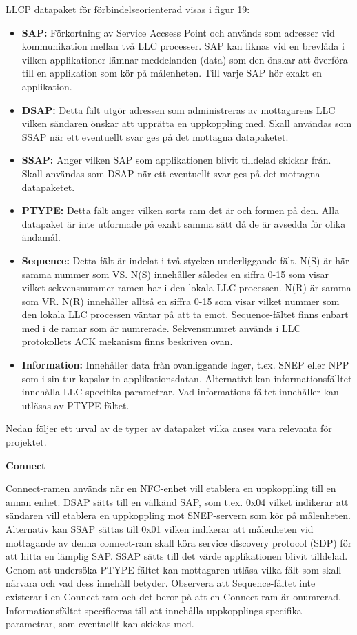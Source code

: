 \documentclass[11pt]{article}
\begin{document}
LLCP datapaket för förbindelseorienterad visas i figur 19: 


\begin{itemize}
\item \textbf{SAP:} Förkortning av Service Accsess Point och används som adresser vid kommunikation mellan två LLC processer. SAP kan liknas vid en brevlåda i vilken applikationer lämnar meddelanden (data) som den önskar att överföra till en applikation som kör på målenheten. Till varje SAP hör exakt en applikation. 
\item \textbf{DSAP:} Detta fält utgör adressen som administreras av mottagarens LLC vilken sändaren önskar att upprätta en uppkoppling med. Skall användas som SSAP när ett eventuellt svar ges på det mottagna datapaketet.
\item \textbf{SSAP:} Anger vilken SAP som applikationen blivit tilldelad skickar från. Skall användas som DSAP när ett eventuellt svar ges på det mottagna datapaketet.
\item \textbf{PTYPE:} Detta fält anger vilken sorts ram det är och formen på den. Alla datapaket är inte utformade på exakt samma sätt då de är avsedda för olika ändamål.
\item \textbf{Sequence:} Detta fält är indelat i två stycken underliggande fält. N(S) är här samma nummer som VS. N(S) innehåller således en siffra 0-15 som visar vilket sekvensnummer ramen har i den lokala LLC processen. N(R) är samma som VR. N(R) innehåller alltså en siffra 0-15 som visar vilket nummer som den lokala LLC processen väntar på att ta emot. Sequence-fältet finns enbart med i de ramar som är numrerade. Sekvensnumret används i LLC protokollets ACK mekanism finns beskriven ovan.
\item \textbf{Information:} Innehåller data från ovanliggande lager, t.ex. SNEP eller NPP som i sin tur kapslar in applikationsdatan. Alternativt kan informationsfälltet innehålla LLC specifika parametrar. Vad informations-fältet innehåller kan utläsas av PTYPE-fältet.
\end{itemize}

Nedan följer ett urval av de typer av datapaket vilka anses vara relevanta för projektet.

\textbf{Connect}


Connect-ramen används när en NFC-enhet vill etablera en uppkoppling till en annan enhet. DSAP sätts till en välkänd SAP, som t.ex. 0x04 vilket indikerar att sändaren vill etablera en uppkoppling mot SNEP-servern som kör på målenheten. Alternativ kan SSAP sättas till 0x01 vilken indikerar att målenheten vid mottagande av denna connect-ram skall köra service discovery protocol (SDP) för att hitta en lämplig SAP. SSAP sätts till det värde applikationen blivit tilldelad. Genom att undersöka PTYPE-fältet kan mottagaren utläsa vilka fält som skall närvara och vad dess innehåll betyder. Observera att Sequence-fältet inte existerar i en Connect-ram och det beror på att en Connect-ram är onumrerad. Informationsfältet specificeras till att innehålla uppkopplings-specifika parametrar, som eventuellt kan skickas med.
\end{document}
